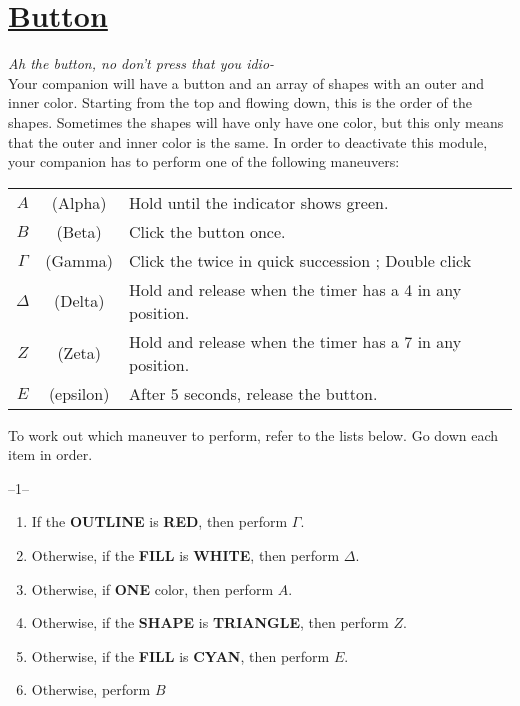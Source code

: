 \documentclass[letterpaper,12pt]{report}
\begin{document}
\section*{\underline{Button}}
\textit{Ah the button, no don't press that you idio-}\\[1cm]
Your companion will have a button and an array of shapes with an outer and inner color. Starting from the top and flowing down, this is the order of the shapes.
Sometimes the shapes will have only have one color, but this only means that the outer and inner color is the same.
In order to deactivate this module, your companion has to perform one of the following maneuvers:
\renewcommand{\arraystretch}{2}
\begin{center}
  \begin{tabular}{|cc|l|}
    \hline
    $A$      & (Alpha)   & Hold until the indicator shows green.                    \\
    $B$      & (Beta)    & Click the button once.                                   \\
    $\Gamma$ & (Gamma)   & Click the twice in quick succession ; Double click       \\
    $\Delta$ & (Delta)   & Hold and release when the timer has a 4 in any position. \\
    $Z$      & (Zeta)    & Hold and release when the timer has a 7 in any position. \\
    $E$      & (epsilon) & After 5 seconds, release the button.                     \\
    \hline
  \end{tabular}
  \renewcommand{\arraystretch}{1}
\end{center}
To work out which maneuver to perform, refer to the lists below. Go down each item in order.
\begin{center}
  --1--
  \begin{enumerate}
    \item If the \textbf{OUTLINE} is \textbf{RED}, then perform $\Gamma$.
    \item Otherwise, if the \textbf{FILL} is \textbf{WHITE}, then perform $\Delta$.
    \item Otherwise, if \textbf{ONE} color, then perform $A$.
    \item Otherwise, if the \textbf{SHAPE} is \textbf{TRIANGLE}, then perform $Z$.
    \item Otherwise, if the \textbf{FILL} is \textbf{CYAN}, then perform $E$.
    \item Otherwise, perform $B$
  \end{enumerate}
\end{center}
\end{document}
